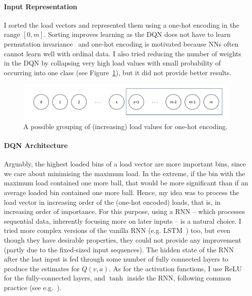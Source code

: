 \paragraph{Input Representation} I sorted the load vectors and represented them using a one-hot encoding in the range $[0, m]$. Sorting improves learning as the DQN does not have to learn permutation invariance~\cite{zaheer2017permutationinvariance} and one-hot encoding is motivated because NNs often cannot learn well with ordinal data. I also tried reducing the number of weights in the DQN by collapsing very high load values with small probability of occurring into one class (see Figure~\ref{NN-maxload}), but it did not provide better results.


\begin{figure}[h]
    \centering
    \includegraphics[scale=0.5]{Chapter3/Figs/NN_maxload.pdf}
    \caption{A possible grouping of (increasing) load values for one-hot encoding.}
    \label{NN-maxload}
\end{figure}


\paragraph{DQN Architecture} Arguably, the highest loaded bins of a load vector are more important bins, since we care about minimising the maximum load. In the extreme, if the bin with the maximum load contained one more ball, that would be more significant than if an average loaded bin contained one more ball. Hence, my idea was to process the load vector in increasing order of the (one-hot encoded) loads, that is, in increasing order of importance. For this purpose, using a RNN -- which processes sequential data, inherently focusing more on later inputs -- is a natural choice. I tried more complex versions of the vanilla RNN (e.g. LSTM~\cite{shewalkar2019rnngrulstm}) too, but even though they have desirable properties, they could not provide any improvement (partly due to the fixed-sized input sequences). The hidden state of the RNN after the last input is fed through some number of fully connected layers to produce the estimates for $Q(v, a)$. As for the activation functions, I use ReLU for the fully-connected layers, and $\tanh$ inside the RNN, following common practice (see e.g.~\cite{szandala2020activationfunctions}).


